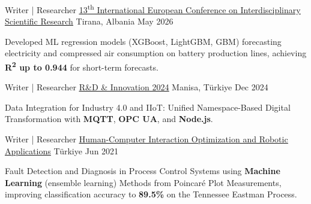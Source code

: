 \vspace{-2mm}


\begin{cventries}

  \cventry
    {Writer | Researcher} %
    {\underline{\href{https://www.eucongress.org/_files/ugd/8f4327_0625909f99ad4ff7ac587a9a1fd87003.pdf}{13\textsuperscript{th} International European Conference on Interdisciplinary Scientific Research}}} %
    {Tirana, Albania} %
    {May 2026} %
    {
      \begin{cvitems} %
        \item {Developed ML regression models (XGBoost, LightGBM, GBM) forecasting electricity and compressed air consumption on battery production lines, achieving \textbf{R\textsuperscript{2} up to 0.944} for short-term forecasts.}
      \end{cvitems}
    }

  \cventry
    {Writer | Researcher} %
{\underline{\href{https://argeinv.mcbu.edu.tr/kongrelerimiz/altinci/ozet/ozet.pdf}{R\&D \& Innovation 2024}}} %
    {Manisa, Türkiye} %
    {Dec 2024} %
    {
      \begin{cvitems} %
        \item {Data Integration for Industry 4.0 and IIoT: Unified Namespace-Based Digital Transformation with \textbf{MQTT}, \textbf{OPC UA}, and \textbf{Node.js}.}
      \end{cvitems}
    }

  \cventry
    {Writer | Researcher} %
{\underline{\href{https://doi.org/10.31590/ejosat.952761}{Human-Computer Interaction Optimization and Robotic Applications}}} %
    {Türkiye} %
    {Jun 2021} %
    {
      \begin{cvitems} %
        \item {Fault Detection and Diagnosis in Process Control Systems using \textbf{Machine Learning} (ensemble learning) Methods from Poincaré Plot Measurements, improving classification accuracy to \textbf{89.5\%} on the Tennessee Eastman Process.}
      \end{cvitems}
    }


\end{cventries}
